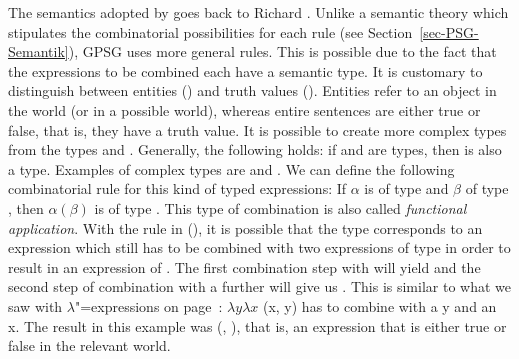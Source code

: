 The semantics adopted by   goes back to Richard
\citet{Montague74a-ed}. Unlike a semantic theory which stipulates the combinatorial possibilities for each rule (see Section~\ref{sec-PSG-Semantik}), GPSG uses
more general rules. This is possible due to the fact that the expressions to be combined each have a semantic type. It is customary to distinguish between entities
() and truth values (). Entities refer to an object in the world (or in a possible world), whereas entire sentences are either true
or false, that is, they have a truth value. It is possible to create more complex types from the types  and . Generally, the following holds: if 
 and  are types, then  is also a type. Examples of complex types are  and . We can define the following combinatorial rule for this kind of typed expressions:
\ea
If $\alpha$ is of type  and $\beta$ of type , then $\alpha(\beta)$ is of type
.
\z
\largerpage[2]
This type of combination is also called \emph{functional application}.
With the rule in (), it is possible that the type  corresponds to an expression which still has to be combined with two expressions of
type  in order to result in an expression of . The first combination step with
 will yield  and the second step of combination with a further
 will give us . This is similar to what we saw with $\lambda$"=expressions on 
page~\pageref{lambda-moegen}: $\lambda y \lambda x$ (x, y) has to combine with a y and an x. The result in this example was 
(, ), that is, an expression that is either true or false in the relevant world.

